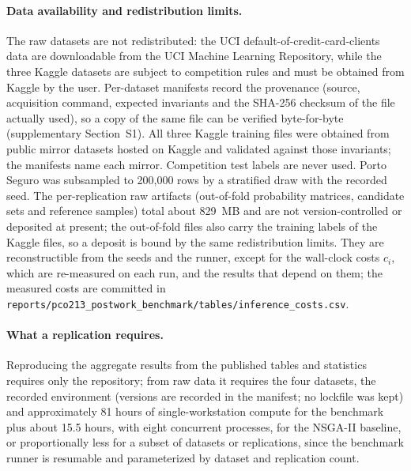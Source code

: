 \paragraph{Data availability and redistribution limits.} The raw datasets are not redistributed: the UCI
default-of-credit-card-clients data are downloadable from the UCI Machine Learning Repository, while the three Kaggle
datasets are subject to competition rules and must be obtained from Kaggle by the user. Per-dataset manifests record
the provenance (source, acquisition command, expected invariants and the SHA-256 checksum of the file actually
used), so a copy of the same file can be verified byte-for-byte (supplementary Section~S1). All three Kaggle training
files were obtained from public mirror datasets hosted on Kaggle and validated against those invariants; the
manifests name each mirror. Competition test labels are never used. Porto Seguro was subsampled to 200{,}000 rows
by a stratified draw with the recorded seed. The per-replication raw artifacts (out-of-fold probability matrices, candidate sets
and reference samples) total about 829~MB and are not version-controlled or deposited at present; the out-of-fold
files also carry the training labels of the Kaggle files, so a deposit is bound by the same redistribution limits.
They are reconstructible from the seeds and the runner, except for the wall-clock costs $c_i$, which are re-measured
on each run, and the results that depend on them; the measured costs are committed in
\texttt{reports/\allowbreak pco213\_postwork\_benchmark/\allowbreak tables/\allowbreak inference\_costs.csv}.

\paragraph{What a replication requires.} Reproducing the aggregate results from the published tables and statistics
requires only the repository; from raw data it requires the four datasets, the recorded environment (versions are
recorded in the manifest; no lockfile was kept) and approximately 81
hours of single-workstation compute for the benchmark plus about 15.5 hours, with eight concurrent processes, for the
NSGA-II baseline, or proportionally less for a subset of datasets or replications, since the benchmark runner is
resumable and parameterized by dataset and replication count.
